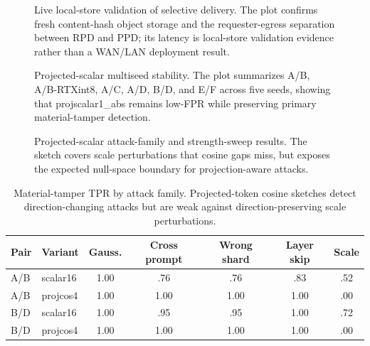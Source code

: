 \documentclass[sigplan,screen,review,anonymous]{acmart}
\newcommand{\suppLiveStoreWidth}{1\linewidth}
\newcommand{\suppProjScalarStabilityWidth}{1\linewidth}
\newcommand{\suppProjScalarBoundaryWidth}{1\linewidth}
\begin{document}
\begin{figure}[t]
\centering
\resizebox{\suppLiveStoreWidth}{!}{}
\caption{Live local-store validation of selective delivery. The plot confirms
fresh content-hash object storage and the requester-egress separation between
RPD and PPD; its latency is local-store validation evidence rather than a
WAN/LAN deployment result.}
\label{fig:app-live-store}
\end{figure}

\begin{figure}[t]
\centering
\resizebox{\suppProjScalarStabilityWidth}{!}{}
\caption{Projected-scalar multiseed stability. The plot summarizes A/B,
A/B-RTXint8, A/C, A/D, B/D, and E/F across five seeds, showing that
projscalar1\_abs remains low-FPR while preserving primary material-tamper
detection.}
\label{fig:app-projscalar-stability}
\end{figure}

\begin{figure}[t]
\centering
\resizebox{\suppProjScalarBoundaryWidth}{!}{}
\caption{Projected-scalar attack-family and strength-sweep results. The sketch
covers scale perturbations that cosine gaps miss, but exposes the expected
null-space boundary for projection-aware attacks.}
\label{fig:app-projscalar-boundary}
\end{figure}

\begin{table}[t]
\centering
\scriptsize
\setlength{\tabcolsep}{2.6pt}
\renewcommand{\arraystretch}{0.92}
\caption{Material-tamper TPR by attack family. Projected-token cosine sketches
detect direction-changing attacks but are weak against direction-preserving
scale perturbations.}
\label{tab:app-material-tamper-exact}
\begin{tabular}{@{}llccccc@{}}
\toprule
Pair & Variant & Gauss. & Cross prompt & Wrong shard & Layer skip & Scale \\
\midrule
A/B & scalar16 & 1.00 & .76 & .76 & .83 & .52 \\
A/B & projcos4 & 1.00 & 1.00 & 1.00 & 1.00 & .00 \\
B/D & scalar16 & 1.00 & .95 & .95 & 1.00 & .72 \\
B/D & projcos4 & 1.00 & 1.00 & 1.00 & 1.00 & .00 \\
\bottomrule
\end{tabular}
\end{table}
\end{document}
